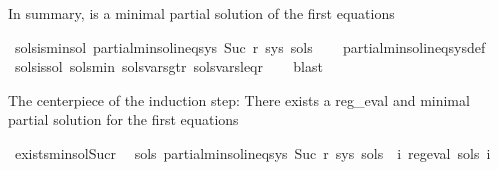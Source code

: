 \begin{isabellebody}
\begin{isamarkuptext}
In summary,  is a minimal partial solution of the first  equations%
\end{isamarkuptext}\isamarkuptrue%
\isamarkupfalse%
\ sols{\isacharprime}{\kern0pt}{\isacharunderscore}{\kern0pt}is{\isacharunderscore}{\kern0pt}min{\isacharunderscore}{\kern0pt}sol{\isacharcolon}{\kern0pt}\ {\isachardoublequoteopen}partial{\isacharunderscore}{\kern0pt}min{\isacharunderscore}{\kern0pt}sol{\isacharunderscore}{\kern0pt}ineq{\isacharunderscore}{\kern0pt}sys\ {\isacharparenleft}{\kern0pt}Suc\ r{\isacharparenright}{\kern0pt}\ sys\ sols{\isacharprime}{\kern0pt}{\isachardoublequoteclose}\isanewline
%
\isadelimproof
\ \ %
\endisadelimproof
%
\isatagproof
{}\isamarkupfalse%
\ partial{\isacharunderscore}{\kern0pt}min{\isacharunderscore}{\kern0pt}sol{\isacharunderscore}{\kern0pt}ineq{\isacharunderscore}{\kern0pt}sys{\isacharunderscore}{\kern0pt}def\isanewline
\ \ \isamarkupfalse%
\ sols{\isacharprime}{\kern0pt}{\isacharunderscore}{\kern0pt}is{\isacharunderscore}{\kern0pt}sol\ sols{\isacharprime}{\kern0pt}{\isacharunderscore}{\kern0pt}min\ sols{\isacharprime}{\kern0pt}{\isacharunderscore}{\kern0pt}vars{\isacharunderscore}{\kern0pt}gt{\isacharunderscore}{\kern0pt}r\ sols{\isacharprime}{\kern0pt}{\isacharunderscore}{\kern0pt}vars{\isacharunderscore}{\kern0pt}leq{\isacharunderscore}{\kern0pt}r\isanewline
\ \ \isamarkupfalse%
\ blast%
\endisatagproof
{\isafoldproof}%
%
\isadelimproof
%
\endisadelimproof
%
\begin{isamarkuptext}%
The centerpiece of the induction step: There exists a reg_eval and minimal partial solution
for the first  equations%
\end{isamarkuptext}\isamarkuptrue%
\isamarkupfalse%
\ exists{\isacharunderscore}{\kern0pt}min{\isacharunderscore}{\kern0pt}sol{\isacharunderscore}{\kern0pt}Suc{\isacharunderscore}{\kern0pt}r{\isacharcolon}{\kern0pt}\isanewline
\ \ {\isachardoublequoteopen}{\isasymexists}sols{\isacharprime}{\kern0pt}{\isachardot}{\kern0pt}\ partial{\isacharunderscore}{\kern0pt}min{\isacharunderscore}{\kern0pt}sol{\isacharunderscore}{\kern0pt}ineq{\isacharunderscore}{\kern0pt}sys\ {\isacharparenleft}{\kern0pt}Suc\ r{\isacharparenright}{\kern0pt}\ sys\ sols{\isacharprime}{\kern0pt}\ {\isasymand}\ {\isacharparenleft}{\kern0pt}{\isasymforall}i{\isachardot}{\kern0pt}\ reg{\isacharunderscore}{\kern0pt}eval\ {\isacharparenleft}{\kern0pt}sols{\isacharprime}{\kern0pt}\ i{\isacharparenright}{\kern0pt}{\isacharparenright}{\kern0pt}{\isachardoublequoteclose}\isanewline

\end{isabellebody}
